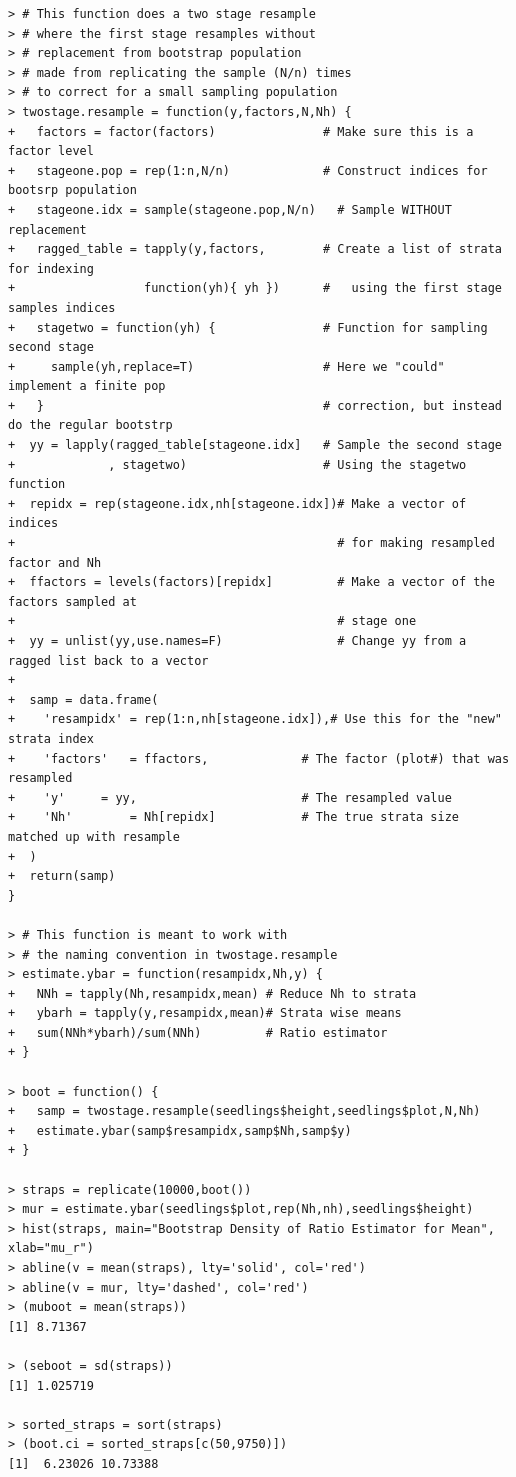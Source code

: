 \documentclass[usenames,dvipsnames]{homework}
\begin{document}
\begin{lstlisting}
> # This function does a two stage resample
> # where the first stage resamples without 
> # replacement from bootstrap population
> # made from replicating the sample (N/n) times
> # to correct for a small sampling population
> twostage.resample = function(y,factors,N,Nh) { 
+   factors = factor(factors)               # Make sure this is a factor level
+   stageone.pop = rep(1:n,N/n)             # Construct indices for bootsrp population 
+   stageone.idx = sample(stageone.pop,N/n)   # Sample WITHOUT replacement
+   ragged_table = tapply(y,factors,        # Create a list of strata for indexing
+                  function(yh){ yh })      #   using the first stage samples indices
+   stagetwo = function(yh) {               # Function for sampling second stage
+     sample(yh,replace=T)                  # Here we "could" implement a finite pop
+   }                                       # correction, but instead do the regular bootstrp
+  yy = lapply(ragged_table[stageone.idx]   # Sample the second stage
+             , stagetwo)                   # Using the stagetwo function
+  repidx = rep(stageone.idx,nh[stageone.idx])# Make a vector of indices 
+                                             # for making resampled factor and Nh
+  ffactors = levels(factors)[repidx]         # Make a vector of the factors sampled at 
+                                             # stage one
+  yy = unlist(yy,use.names=F)                # Change yy from a ragged list back to a vector
+
+  samp = data.frame(
+    'resampidx' = rep(1:n,nh[stageone.idx]),# Use this for the "new" strata index
+    'factors'   = ffactors,		     # The factor (plot#) that was resampled
+    'y'	 = yy,                       # The resampled value
+    'Nh'        = Nh[repidx]		     # The true strata size matched up with resample
+  )
+  return(samp)
}

> # This function is meant to work with
> # the naming convention in twostage.resample
> estimate.ybar = function(resampidx,Nh,y) {
+   NNh = tapply(Nh,resampidx,mean) # Reduce Nh to strata
+   ybarh = tapply(y,resampidx,mean)# Strata wise means
+   sum(NNh*ybarh)/sum(NNh)         # Ratio estimator
+ }

> boot = function() {
+   samp = twostage.resample(seedlings$height,seedlings$plot,N,Nh)
+   estimate.ybar(samp$resampidx,samp$Nh,samp$y)
+ }

> straps = replicate(10000,boot())
> mur = estimate.ybar(seedlings$plot,rep(Nh,nh),seedlings$height) 
> hist(straps, main="Bootstrap Density of Ratio Estimator for Mean", xlab="mu_r") 
> abline(v = mean(straps), lty='solid', col='red') 
> abline(v = mur, lty='dashed', col='red') 
> (muboot = mean(straps))
[1] 8.71367 

> (seboot = sd(straps))
[1] 1.025719

> sorted_straps = sort(straps) 
> (boot.ci = sorted_straps[c(50,9750)])
[1]  6.23026 10.73388
\end{lstlisting}
\end{document}

